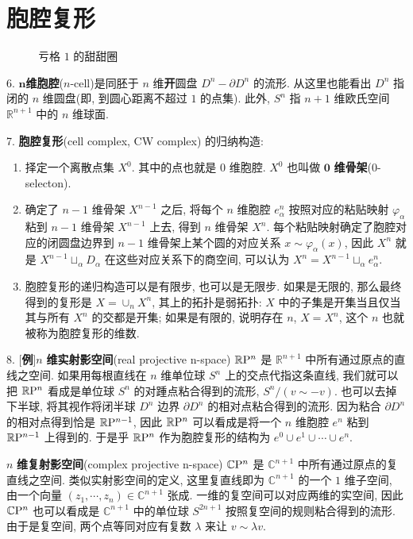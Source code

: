 \section{胞腔复形}


\begin{figure}[h]
\centering

\caption{亏格 $1$ 的甜甜圈}
\end{figure}

6. $\mathbf{n}${\bf 维胞腔}($n$-cell)是同胚于 $n$ 维{\bf 开}圆盘 $D^n - \partial D^n$ 的流形. 从这里也能看出 $D^n$ 指闭的 $n$ 维圆盘(即, 到圆心距离不超过 $1$ 的点集). 此外, $S^n$ 指 $n + 1$ 维欧氏空间 $\mathbb{R}^{n + 1}$ 中的 $n$ 维球面.

7. {\bf 胞腔复形}(cell complex, CW complex) 的归纳构造:
\begin{enumerate}[label=(\arabic*)]
	\item 择定一个离散点集 $X^0$. 其中的点也就是 $0$ 维胞腔. $X^0$ 也叫做 $\mathbf{0}$ {\bf 维骨架}($0$-selecton).
	\item 确定了 $n - 1$ 维骨架 $X^{n - 1}$ 之后, 将每个 $n$ 维胞腔 $e^{n}_{\alpha}$ 按照对应的粘贴映射 $\varphi_{\alpha}$ 粘到 $n - 1$ 维骨架 $X^{n - 1}$ 上去, 得到 $n$ 维骨架 $X^n$. 每个粘贴映射确定了胞腔对应的闭圆盘边界到 $n - 1$ 维骨架上某个圆的对应关系 $x \sim \varphi_{\alpha}(x)$, 因此 $X^n$ 就是 $X^{n - 1} \sqcup_{\alpha} D_{\alpha}$ 在这些对应关系下的商空间, 可以认为 $X^n = X^{n - 1} \sqcup_{\alpha} e^n_{\alpha}$.
	\item 胞腔复形的递归构造可以是有限步, 也可以是无限步. 如果是无限的, 那么最终得到的复形是 $X = \cup_{n}X^n$, 其上的拓扑是弱拓扑: $X$ 中的子集是开集当且仅当其与所有 $X^n$ 的交都是开集; 如果是有限的, 说明存在 $n$, $X = X^n$, 这个 $n$ 也就被称为胞腔复形的维数.
\end{enumerate}

8. [{\bf 例}]$n$ {\bf 维}{\bf 实射影空间}(real projective n-space) $\mathbb{R}\mathrm{P}^{n}$ 是 $\mathbb{R}^{n + 1}$ 中所有通过原点的直线之空间. 如果用每根直线在 $n$ 维单位球 $S^{n}$ 上的交点代指这条直线, 我们就可以把 $\mathbb{R}\mathrm{P}^{n}$ 看成是单位球 $S^{n}$ 的对踵点粘合得到的流形, $S^{n} / (v \sim -v)$. 也可以去掉下半球, 将其视作将闭半球 $D^n$ 边界 $\partial D^n$ 的相对点粘合得到的流形. 因为粘合 $\partial D^n$ 的相对点得到恰是 $\mathbb{R}\mathrm{P}^{n - 1}$, 因此 $\mathbb{R}\mathrm{P}^{n}$ 可以看成是将一个 $n$ 维胞腔 $e^n$ 粘到 $\mathbb{R}\mathrm{P}^{n - 1}$ 上得到的. 于是乎 $\mathbb{R}\mathrm{P}^{n}$ 作为胞腔复形的结构为 $e^0 \cup e^1 \cup \cdots \cup e^n$.

$n$ {\bf 维}{\bf 复射影空间}(complex projective n-space) $\mathbb{C}\mathrm{P}^{n}$ 是 $\mathbb{C}^{n + 1}$ 中所有通过原点的复直线之空间. 类似实射影空间的定义, 这里复直线即为 $\mathbb{C}^{n + 1}$ 的一个 $1$ 维子空间, 由一个向量 $(z_1, \cdots, z_n) \in \mathbb{C}^{n + 1}$ 张成. 一维的复空间可以对应两维的实空间, 因此 $\mathbb{C}\mathrm{P}^{n}$ 也可以看成是 $\mathbb{C}^{n + 1}$ 中的单位球 $S^{2n + 1}$ 按照复空间的规则粘合得到的流形. 由于是复空间, 两个点等同对应有复数 $\lambda$ 来让 $v \sim \lambda v$. 

